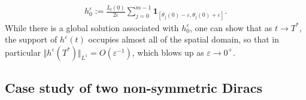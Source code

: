 \documentclass[10pt]{article}
\theoremstyle{definition}
\theoremstyle{remark}
\numberwithin{equation}{section}
\newcommand{\nrm}[1]{\Vert#1\Vert}
\newcommand{\0}{\emptyset}
\newcommand{\tht}{\theta}
\newcommand{\varep}{\varepsilon}
\begin{document}
\begin{equation}
		\begin{split}
			h_{0}^{\varep} := \frac{I_{0}(0)}{2\varep} \sum_{j=0}^{m-1} \mathbf{1}_{[\tht_{j}(0)-\varep, \tht_{j}(0)+\varep]}. 
		\end{split}
	\end{equation} While there is a global solution associated with $h_{0}^{\varep} $, one can show that as $t\to T^*$, the support of $h^{\varep}(t) $ occupies almost all of the spatial domain, so that in particular $\nrm{ h^{\varep} (T^*) }_{L^{1}} = O(\varep^{-1})$, which blows up as $\varep\to 0^+$. 
	
	\subsection{Case study of two non-symmetric Diracs}\label{subsec:case-study-2}
\end{document}
